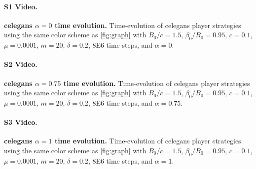 \documentclass[10pt,letterpaper]{article}
\begin{document}
\paragraph{S1 Video.}
\textbf{\Gls{celegans} $\alpha = 0$ time evolution.}
Time-evolution of \gls{celegans} player strategies
using the same color scheme as \cref{fig:graph}
with $B_0/c = 1.5$, $\beta_0/B_0 = 0.95$, $c = 0.1$,
$\mu = 0.0001$, $m = 20$, $\delta = 0.2$, \num{8E6} time steps,
and $\alpha = 0$.

\paragraph{S2 Video.}
\textbf{\Gls{celegans} $\alpha = 0.75$ time evolution.}
Time-evolution of \gls{celegans} player strategies
using the same color scheme as \cref{fig:graph}
with $B_0/c = 1.5$, $\beta_0/B_0 = 0.95$, $c = 0.1$,
$\mu = 0.0001$, $m = 20$, $\delta = 0.2$, \num{8E6} time steps,
and $\alpha = 0.75$.

\paragraph{S3 Video.}
\textbf{\Gls{celegans} $\alpha = 1$ time evolution.}
Time-evolution of \gls{celegans} player strategies
using the same color scheme as \cref{fig:graph}
with $B_0/c = 1.5$, $\beta_0/B_0 = 0.95$, $c = 0.1$,
$\mu = 0.0001$, $m = 20$, $\delta = 0.2$, \num{8E6} time steps,
and $\alpha = 1$.


\end{document}
